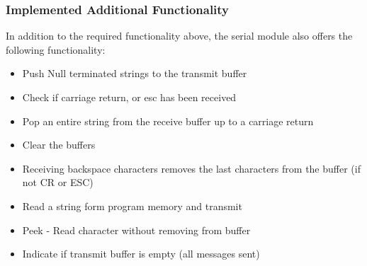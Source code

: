 \documentclass[]{report}
\begin{document}
\subsubsection{Implemented Additional Functionality}
In addition to the required functionality above, the serial module also offers the following functionality:
\begin{itemize}
	\item Push Null terminated strings to the transmit buffer
	\item Check if carriage return, or esc has been received
	\item Pop an entire string from the receive buffer up to a carriage return
	\item Clear the buffers
	\item Receiving backspace characters removes the last characters from the buffer (if not CR or ESC)
	\item Read a string form program memory and transmit
	\item Peek - Read character without removing from buffer
	\item Indicate if transmit buffer is empty (all messages sent)
\end{itemize}
\end{document}

